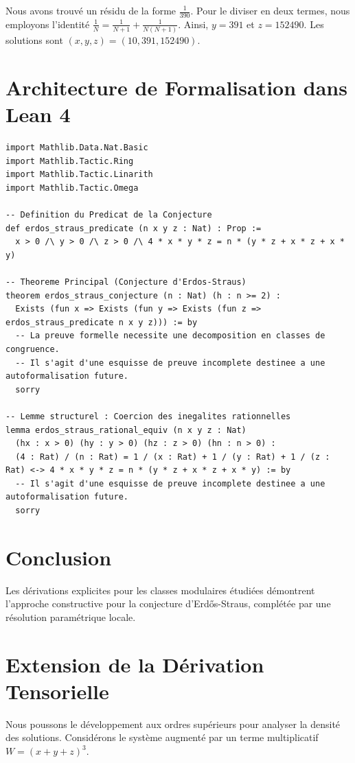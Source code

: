 \documentclass[11pt,a4paper]{article}
\begin{document}
Nous avons trouvé un résidu de la forme $\frac{1}{390}$. Pour le diviser en deux termes, nous employons l'identité $\frac{1}{N} = \frac{1}{N+1} + \frac{1}{N(N+1)}$.
Ainsi, $y = 391$ et $z = 152490$.
Les solutions sont $(x, y, z) = (10, 391, 152490)$.

\section{Architecture de Formalisation dans Lean 4}

\begin{verbatim}
import Mathlib.Data.Nat.Basic
import Mathlib.Tactic.Ring
import Mathlib.Tactic.Linarith
import Mathlib.Tactic.Omega

-- Definition du Predicat de la Conjecture
def erdos_straus_predicate (n x y z : Nat) : Prop :=
  x > 0 /\ y > 0 /\ z > 0 /\ 4 * x * y * z = n * (y * z + x * z + x * y)

-- Theoreme Principal (Conjecture d'Erdos-Straus)
theorem erdos_straus_conjecture (n : Nat) (h : n >= 2) :
  Exists (fun x => Exists (fun y => Exists (fun z => erdos_straus_predicate n x y z))) := by
  -- La preuve formelle necessite une decomposition en classes de congruence.
  -- Il s'agit d'une esquisse de preuve incomplete destinee a une autoformalisation future.
  sorry

-- Lemme structurel : Coercion des inegalites rationnelles
lemma erdos_straus_rational_equiv (n x y z : Nat)
  (hx : x > 0) (hy : y > 0) (hz : z > 0) (hn : n > 0) :
  (4 : Rat) / (n : Rat) = 1 / (x : Rat) + 1 / (y : Rat) + 1 / (z : Rat) <-> 4 * x * y * z = n * (y * z + x * z + x * y) := by
  -- Il s'agit d'une esquisse de preuve incomplete destinee a une autoformalisation future.
  sorry
\end{verbatim}

\section{Conclusion}
Les dérivations explicites pour les classes modulaires étudiées démontrent l'approche constructive pour la conjecture d'Erd\H{{o}}s-Straus, complétée par une résolution paramétrique locale.

\section{Extension de la Dérivation Tensorielle}
Nous poussons le développement aux ordres supérieurs pour analyser la densité des solutions.
Considérons le système augmenté par un terme multiplicatif $W = (x+y+z)^3$.
\end{document}
